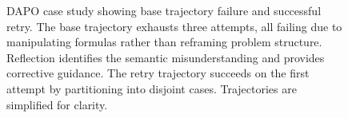 \begin{figure}[b]
\begin{tcolorbox}[
    colback=white,
    colframe=black!70,
    title=\textbf{Retry Trajectory (guidance removed for training)},
    fonttitle=\bfseries\small,
    width=\textwidth,
    boxrule=0.5pt
]
\end{tcolorbox}

\caption{DAPO case study showing base trajectory failure and successful retry. The base trajectory exhausts three attempts, all failing due to manipulating formulas rather than reframing problem structure. Reflection identifies the semantic misunderstanding and provides corrective guidance. The retry trajectory succeeds on the first attempt by partitioning into disjoint cases. Trajectories are simplified for clarity.}
\label{fig:case_dapo}
\end{figure}